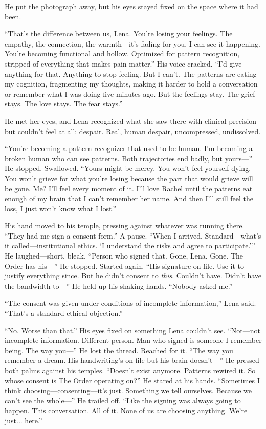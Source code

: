 He put the photograph away, but his eyes stayed fixed on the space where it had been.

``That's the difference between us, Lena. You're losing your feelings. The empathy, the connection, the warmth—it's fading for you. I can see it happening. You're becoming functional and hollow. Optimized for pattern recognition, stripped of everything that makes pain matter.'' His voice cracked. ``I'd give anything for that. Anything to stop feeling. But I can't. The patterns are eating my cognition, fragmenting my thoughts, making it harder to hold a conversation or remember what I was doing five minutes ago. But the feelings stay. The grief stays. The love stays. The fear stays.''

He met her eyes, and Lena recognized what she saw there with clinical precision but couldn't feel at all: despair. Real, human despair, uncompressed, undissolved.

``You're becoming a pattern-recognizer that used to be human. I'm becoming a broken human who can see patterns. Both trajectories end badly, but yours—'' He stopped. Swallowed. ``Yours might be mercy. You won't feel yourself dying. You won't grieve for what you're losing because the part that would grieve will be gone. Me? I'll feel every moment of it. I'll love Rachel until the patterns eat enough of my brain that I can't remember her name. And then I'll still feel the loss, I just won't know what I lost.''

His hand moved to his temple, pressing against whatever was running there. ``They had me sign a consent form.'' A pause. ``When I arrived. Standard—what's it called—institutional ethics. `I understand the risks and agree to participate.''' He laughed—short, bleak. ``Person who signed that. Gone, Lena. Gone. The Order has his—'' He stopped. Started again. ``His signature on file. Use it to justify everything since. But he didn't consent to \textit{this}. Couldn't have. Didn't have the bandwidth to—'' He held up his shaking hands. ``Nobody asked me.''

``The consent was given under conditions of incomplete information,'' Lena said. ``That's a standard ethical objection.''

``No. Worse than that.'' His eyes fixed on something Lena couldn't see. ``Not—not incomplete information. Different person. Man who signed is someone I remember being. The way you—'' He lost the thread. Reached for it. ``The way you remember a dream. His handwriting's on file but his brain doesn't—'' He pressed both palms against his temples. ``Doesn't exist anymore. Patterns rewired it. So whose consent is The Order operating on?'' He stared at his hands. ``Sometimes I think choosing—consenting—it's just. Something we tell ourselves. Because we can't see the whole—'' He trailed off. ``Like the signing was always going to happen. This conversation. All of it. None of us are choosing anything. We're just... here.''

